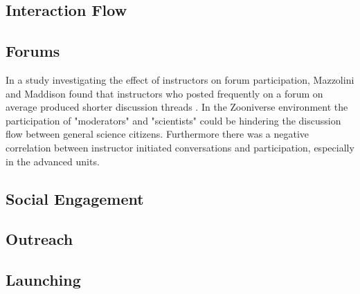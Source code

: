 \documentclass{sigchi}
\begin{document}
\subsection{Interaction Flow}


\subsection{Forums}

In a study investigating the effect of instructors on forum participation, Mazzolini and Maddison found that instructors who posted frequently on a forum on average produced shorter discussion threads \cite{mazzolini2003sage}. In the Zooniverse environment the participation of "moderators" and "scientists" could be hindering the discussion flow between general science citizens. Furthermore there was a negative correlation between instructor initiated conversations and participation, especially in the advanced units\cite{mazzolini2003sage}. 



\subsection{Social Engagement}


\subsection{Outreach}


\subsection{Launching}
\end{document}
